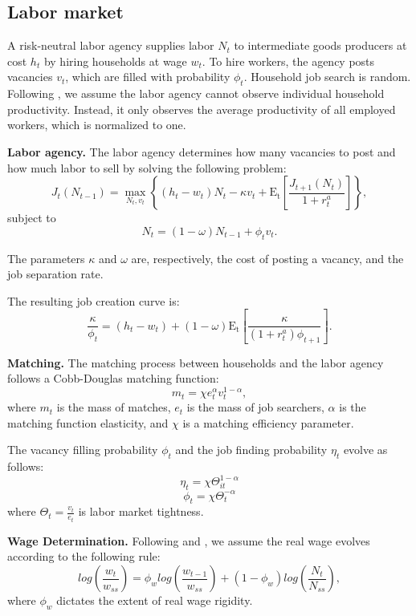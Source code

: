 \documentclass[\econtexRoot/HAFiscal]{subfiles}
\begin{document}
\subsection{Labor market}

A risk-neutral labor agency supplies labor \( N_t \) to intermediate goods producers at cost \( h_t \) by hiring households at wage \( w_t \). To hire workers, the agency posts vacancies \( v_t \), which are filled with probability \( \phi_t \). Household job search is random. Following \cite{Bardoczy2022}, we assume the labor agency cannot observe individual household productivity. Instead, it only observes the average productivity of all employed workers, which is normalized to one.


\textbf{Labor agency.} The labor agency determines how many vacancies to post and how much labor to sell by solving the following problem: 
$$J_{t}(N_{t-1})  = \max_{N_{t},v_{t}} \left\{( h_{t} - w_{t}) N_{t}- \kappa v_{t} + \mathrm{E_{t}}\left[ \frac{J_{t+1}(N_{t})}{1 + r^{a}_{t}}\right]\right\},$$
subject to
$$ N_{t} = (1-\omega)N_{t-1} + \phi_{t} v_{t}.$$ 

The parameters $\kappa$ and $\omega$ are, respectively, the cost of posting a vacancy, and the job separation rate. 

The resulting job creation curve is:
$$ \frac{\kappa}{\phi_{t}}  = (h_{t} - w_{t})+  (1-\omega)\mathrm{E_{t}}\left[   \frac{\kappa}{(1+r^{a}_{t}) \phi_{t+1}} \right].$$

\textbf{Matching.} The matching process between households and the labor agency follows a Cobb-Douglas matching function:
$$m_{t} = \chi e_{t}^{\alpha} v_{t}^{1-\alpha},$$ 
where $m_{t}$ is the mass of matches, $e_{t}$ is the mass of job searchers, $\alpha$ is the matching function elasticity, and $\chi$ is a matching efficiency parameter.

The vacancy filling probability \( \phi_t \) and the job finding probability \( \eta_t \) evolve as follows:
$$\eta_{t} = \chi \Theta_{it}^{1-\alpha} $$
$$ \phi_{t} = \chi \Theta_{t}^{-\alpha} $$ 
where $\Theta_{t} = \frac{v_{t}}{e_{t}}$ is labor market tightness.

\textbf{Wage Determination.} Following \cite{Gornemann2021} and \cite{Blanchard2010}, we assume the real wage evolves according to the following rule:
$$log\left(\frac{w_{t}}{w_{ss}}\right)  = \phi_w log\left( \frac{ w_{t-1}}{ w_{ss}} \right) +   (1 - \phi_w) log\left( \frac{N_{t}}{N_{ss}}\right),$$
where $\phi_w$ dictates the extent of real wage rigidity. 
\end{document}

